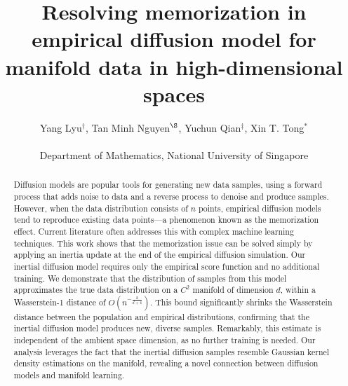 \documentclass{article}
\begin{document}
\title{Resolving memorization in empirical diffusion model for manifold data in high-dimensional spaces}
\author{
    Yang Lyu$^{\dagger}$,
    Tan Minh Nguyen$^{\S}$,
    Yuchun Qian$^{\ddagger}$, 
    Xin T. Tong$^{*}$\\
    \\
    Department of Mathematics, National University of Singapore
}

\date{}

\begingroup
\renewcommand\thefootnote{}
\endgroup

\maketitle

\begin{abstract}
Diffusion models are popular tools for generating new data samples, using a forward process that adds noise to data and a reverse process to denoise and produce samples. However, when the data distribution consists of $n$ points, empirical diffusion models tend to reproduce existing data points—a phenomenon known as the memorization effect. Current literature often addresses this with complex machine learning techniques. This work shows that the memorization issue can be solved simply by applying an inertia update at the end of the empirical diffusion simulation. Our inertial diffusion model requires only the empirical score function and no additional training. We demonstrate that the distribution of samples from this model approximates the true data distribution on a $C^2$ manifold of dimension $d$, within a Wasserstein-1 distance of $O(n^{-\frac{2}{d+4}})$. This bound significantly shrinks the Wasserstein distance between the population and empirical distributions, confirming that the inertial diffusion model produces new, diverse samples. Remarkably, this estimate is independent of the ambient space dimension, as no further training is needed. Our analysis leverages the fact that the inertial diffusion samples resemble Gaussian kernel density estimations on the manifold, revealing a novel connection between diffusion models and manifold learning.    
\end{abstract}
\end{document}
